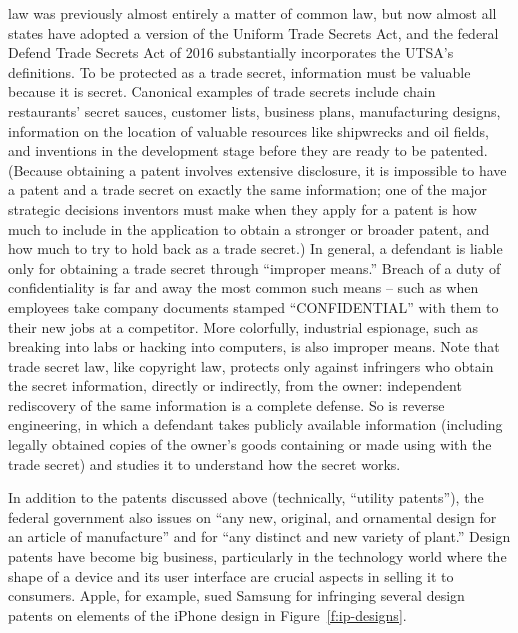  law was previously almost entirely
a matter of common law, but now almost all states have adopted a version of the
Uniform Trade Secrets Act, and the federal Defend Trade Secrets Act of 2016
substantially incorporates the UTSA's definitions. To be protected as
a trade secret, information must be valuable because it is secret. Canonical
examples of trade secrets include chain restaurants' secret sauces, customer
lists, business plans, manufacturing designs, information on the location of
valuable resources like shipwrecks and oil fields, and inventions in the
development stage before they are ready to be patented. (Because obtaining a
patent involves extensive disclosure, it is impossible to have a patent and a
trade secret on exactly the same information; one of the major strategic
decisions inventors must make when they apply for a patent is how much to
include in the application to obtain a stronger or broader patent, and how much
to try to hold back as a trade secret.) In general, a defendant is liable only
for obtaining a trade secret through ``improper means.'' Breach of a duty of
confidentiality is far and away the most common such means -- such as when
employees take company documents stamped ``CONFIDENTIAL'' with them to their
new jobs at a competitor. More colorfully, industrial espionage, such as
breaking into labs or hacking into computers, is also improper means. Note that
trade secret law, like copyright law, protects only against infringers who
obtain the secret information, directly or indirectly, from the owner:
independent rediscovery of the same information is a complete defense. So is
reverse engineering, in which a defendant takes publicly available information
(including legally obtained copies of the owner's goods containing or made
using with the trade secret) and studies it to understand how the secret works.

In addition to the patents discussed above (technically, ``utility
patents''), the federal government also issues  on ``any
new, original, and ornamental design for an article of
manufacture'' and  for ``any distinct
and new variety of plant.'' Design patents have become big business,
particularly in the technology world where the shape of a device and its user
interface are crucial aspects in selling it to consumers. Apple, for example,
sued Samsung for infringing several design patents on elements of the
iPhone design in Figure~\ref{f:ip-designs}.

